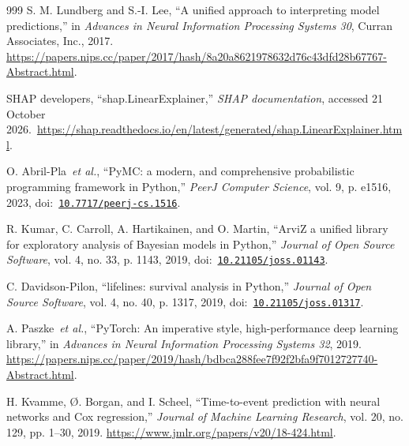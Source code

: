 \begin{thebibliography}{999}
\def\currentbiburl{https://papers.nips.cc/paper/2017/hash/8a20a8621978632d76c43dfd28b67767-Abstract.html}
S. M. Lundberg and S.-I. Lee, ``A unified approach to interpreting model predictions,'' in \emph{Advances in Neural Information Processing Systems 30}, Curran Associates, Inc., 2017. \url{https://papers.nips.cc/paper/2017/hash/8a20a8621978632d76c43dfd28b67767-Abstract.html}.

\def\currentbiburl{https://shap.readthedocs.io/en/latest/generated/shap.LinearExplainer.html}
SHAP developers, ``shap.LinearExplainer,'' \emph{SHAP documentation}, accessed 21 October 2026.~\url{https://shap.readthedocs.io/en/latest/generated/shap.LinearExplainer.html}.

\def\currentbiburl{https://doi.org/10.7717/peerj-cs.1516}
 O. Abril-Pla~\emph{et al.}, ``PyMC: a modern, and comprehensive probabilistic programming framework in Python,'' \emph{PeerJ Computer Science}, vol. 9, p. e1516, 2023, doi:~\href{https://doi.org/10.7717/peerj-cs.1516}{\nolinkurl{10.7717/peerj-cs.1516}}.

\def\currentbiburl{https://doi.org/10.21105/joss.01143}
 R. Kumar, C. Carroll, A. Hartikainen, and O. Martin, ``ArviZ a unified library for exploratory analysis of Bayesian models in Python,'' \emph{Journal of Open Source Software}, vol. 4, no. 33, p. 1143, 2019, doi:~\href{https://doi.org/10.21105/joss.01143}{\nolinkurl{10.21105/joss.01143}}.

\def\currentbiburl{https://doi.org/10.21105/joss.01317}
 C. Davidson-Pilon, ``lifelines: survival analysis in Python,'' \emph{Journal of Open Source Software}, vol. 4, no. 40, p. 1317, 2019, doi:~\href{https://doi.org/10.21105/joss.01317}{\nolinkurl{10.21105/joss.01317}}.

\def\currentbiburl{https://papers.nips.cc/paper/2019/hash/bdbca288fee7f92f2bfa9f7012727740-Abstract.html}
 A. Paszke~\emph{et al.}, ``PyTorch: An imperative style, high-performance deep learning library,'' in \emph{Advances in Neural Information Processing Systems 32}, 2019. \url{https://papers.nips.cc/paper/2019/hash/bdbca288fee7f92f2bfa9f7012727740-Abstract.html}.

\def\currentbiburl{https://www.jmlr.org/papers/v20/18-424.html}
 H. Kvamme, Ø. Borgan, and I. Scheel, ``Time-to-event prediction with neural networks and Cox regression,'' \emph{Journal of Machine Learning Research}, vol. 20, no. 129, pp. 1--30, 2019. \url{https://www.jmlr.org/papers/v20/18-424.html}.

\end{thebibliography}
